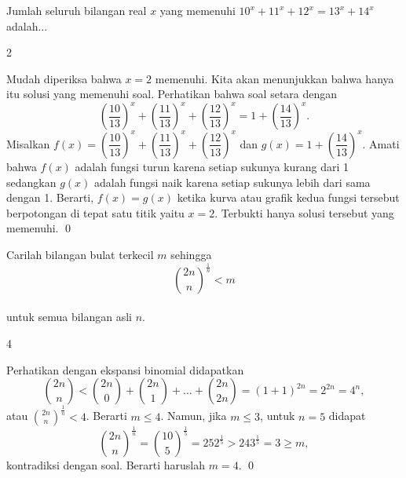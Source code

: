 \documentclass[12pt]{scrartcl}
\begin{document}
	\begin{soalbaru}
		Jumlah seluruh bilangan real $x$ yang memenuhi $10^x+11^x+12^x=13^x+14^x$ adalah... %
		\begin{jawaban}
		2
		\end{jawaban}
		\begin{solusi}
		Mudah diperiksa bahwa $x=2$ memenuhi. Kita akan menunjukkan bahwa hanya itu solusi yang memenuhi soal. Perhatikan bahwa soal setara dengan $$\left(\dfrac{10}{13}\right)^x+\left(\dfrac{11}{13}\right)^x+\left(\dfrac{12}{13}\right)^x=1+\left(\dfrac{14}{13}\right)^x.$$ Misalkan $f(x)=\left(\dfrac{10}{13}\right)^x+\left(\dfrac{11}{13}\right)^x+\left(\dfrac{12}{13}\right)^x$ dan $g(x)=1+\left(\dfrac{14}{13}\right)^x.$ Amati bahwa $f(x)$ adalah fungsi turun karena setiap sukunya kurang dari 1 sedangkan $g(x)$ adalah fungsi naik karena setiap sukunya lebih dari sama dengan 1. Berarti, $f(x)=g(x)$ ketika kurva atau grafik kedua fungsi tersebut berpotongan di tepat satu titik yaitu $x=2$. Terbukti hanya solusi tersebut yang memenuhi. \qed
		\end{solusi}
	\end{soalbaru}
	\vspace{10pt}
	\begin{soalbaru}
		Carilah bilangan bulat terkecil $m$ sehingga\\[-15pt] $${2n \choose n}^{\frac{1}{n}}<m$$\\[-20pt] untuk semua bilangan asli $n$.%
		
		\begin{jawaban}
		4
		\end{jawaban}
		\begin{solusi}
		Perhatikan dengan ekspansi binomial didapatkan $${2n \choose n} < {2n \choose 0}+{2n \choose 1}+\dots+{2n \choose 2n}=(1+1)^{2n}=2^{2n}=4^n,$$
		atau ${2n \choose n}^{\frac{1}{n}} < 4$. Berarti $m \le 4$. Namun, jika $m \le 3$, untuk $n=5$ didapat $${2n \choose n}^{\frac{1}{n}}={10 \choose 5}^{\frac{1}{5}}=252^{\frac{1}{5}} > 243^{\frac{1}{5}} = 3 \ge m,$$ kontradiksi dengan soal. Berarti haruslah $m=4$. \qed
		\end{solusi}
	\end{soalbaru}
	
\end{document}
